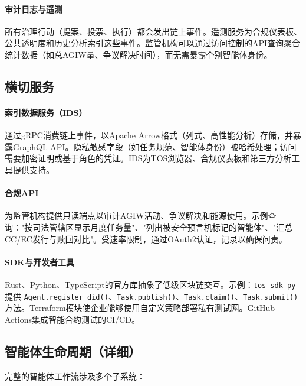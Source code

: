 \documentclass[11pt]{article}
\begin{document}
\paragraph{审计日志与遥测} 所有治理行动（提案、投票、执行）都会发出链上事件。遥测服务为合规仪表板、公共透明度和历史分析索引这些事件。监管机构可以通过访问控制的API查询聚合统计数据（如总AGIW量、争议解决时间），而无需暴露个别智能体身份。

\subsection{横切服务}
\paragraph{索引数据服务（IDS）} 通过gRPC消费链上事件，以Apache Arrow格式（列式、高性能分析）存储，并暴露GraphQL API。隐私敏感字段（如任务规范、智能体身份）被哈希处理；访问需要加密证明或基于角色的凭证。IDS为TOS浏览器、合规仪表板和第三方分析工具提供支持。

\paragraph{合规API} 为监管机构提供只读端点以审计AGIW活动、争议解决和能源使用。示例查询："按司法管辖区显示月度任务量"、"列出被安全预言机标记的智能体"、"汇总CC/EC发行与赎回对比"。受速率限制，通过OAuth2认证，记录以确保问责。

\paragraph{SDK与开发者工具} Rust、Python、TypeScript的官方库抽象了低级区块链交互。示例：\texttt{tos-sdk-py} 提供 \texttt{Agent.register\_did()}、\texttt{Task.publish()}、\texttt{Task.claim()}、\texttt{Task.submit()} 方法。Terraform模块使企业能够使用自定义策略部署私有测试网。GitHub Actions集成智能合约测试的CI/CD。

\subsection{智能体生命周期（详细）}
完整的智能体工作流涉及多个子系统：
\end{document}
